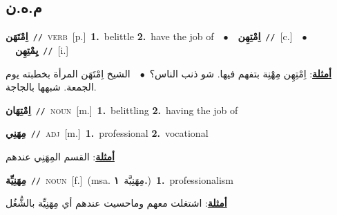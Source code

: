 \documentclass[10pt,a4paper,twoside]{article} %
\begin{document}
\begin{multicols}{2}
\vspace{-3mm}
\subsection*{\color{blue}\foreignlanguage{arabic}{م.ه.ن}\color{blue}{}} 

{\setlength\topsep{0pt}\textbf{\foreignlanguage{arabic}{اِمْتَهَن}}\ {\color{gray}\texttt{//}\color{black}}\ \textsc{verb}\ [p.]\ \textbf{1.}~belittle  \textbf{2.}~have the job of\ \ $\bullet$\ \ \setlength\topsep{0pt}\textbf{\foreignlanguage{arabic}{اِمْتِهِن}}\ {\color{gray}\texttt{//}\color{black}}\ [c.]\ \ $\bullet$\ \ \setlength\topsep{0pt}\textbf{\foreignlanguage{arabic}{يِمْتِهِن}}\ {\color{gray}\texttt{//}\color{black}}\ [i.]\  \begin{flushright}\color{gray}\foreignlanguage{arabic}{\textbf{\underline{\foreignlanguage{arabic}{أمثلة}}}: اِمْتِهِن مِهْنِة بتفهم فيها. شو ذنب الناس؟\ $\bullet$\ \  الشيخ اِمْتَهَن المرأة بخطبته يوم الجمعة. شبهها بالجاجة.}\end{flushright}\color{black}} \vspace{2mm}

{\setlength\topsep{0pt}\textbf{\foreignlanguage{arabic}{اِمْتِهَان}}\ {\color{gray}\texttt{//}\color{black}}\ \textsc{noun}\ [m.]\ \textbf{1.}~belittling  \textbf{2.}~having the job of\ } \vspace{2mm}

{\setlength\topsep{0pt}\textbf{\foreignlanguage{arabic}{مِهَنِي}}\ {\color{gray}\texttt{//}\color{black}}\ \textsc{adj}\ [m.]\ \textbf{1.}~professional  \textbf{2.}~vocational\  \begin{flushright}\color{gray}\foreignlanguage{arabic}{\textbf{\underline{\foreignlanguage{arabic}{أمثلة}}}: القسم المِهَنِي عندهم}\end{flushright}\color{black}} \vspace{2mm}

{\setlength\topsep{0pt}\textbf{\foreignlanguage{arabic}{مِهَنِيِّة}}\ {\color{gray}\texttt{//}\color{black}}\ \textsc{noun}\ [f.]\ \color{gray}(msa. \foreignlanguage{arabic}{مِهَنِيَّة}~\foreignlanguage{arabic}{\textbf{١.}})\color{black}\ \textbf{1.}~professionalism\  \begin{flushright}\color{gray}\foreignlanguage{arabic}{\textbf{\underline{\foreignlanguage{arabic}{أمثلة}}}: اشتغلت معهم وماحسيت عندهم أي مِهَنِيِّة بالشُّغُل}\end{flushright}\color{black}} \vspace{2mm}


\end{multicols}
\end{document}
